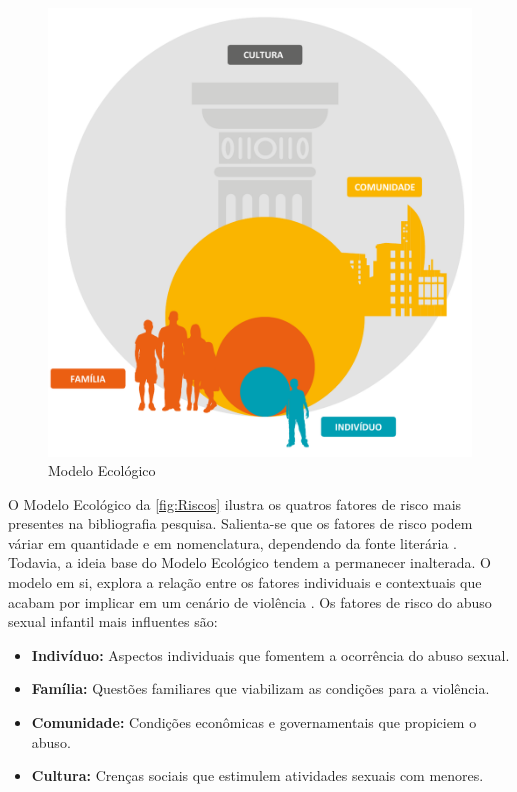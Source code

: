 \begin{figure}[htb]

	\caption{\label{fig:Riscos}Modelo Ecológico}
  \begin{center}
    \includegraphics[width=0.75\linewidth]{./Figuras/FatoresRisco.pdf}
	\end{center}

\end{figure}

O Modelo Ecológico da \autoref{fig:Riscos} ilustra os quatros fatores de risco mais presentes na bibliografia pesquisa. Salienta-se que os fatores de risco podem váriar em quantidade e em nomenclatura, dependendo da fonte literária \cite{centers2004sexual, sexual2017department, blasco2018abuso, topromising}. Todavia, a ideia base do Modelo Ecológico tendem a permanecer inalterada. O modelo em si, explora a relação entre os fatores individuais e contextuais que acabam por implicar em um cenário de violência \cite{dahlberg2006violencia}. Os fatores de risco do abuso sexual infantil mais influentes são:

\begin{itemize}
  \item \textbf{Indivíduo:} \hfill Aspectos individuais que fomentem a ocorrência do abuso sexual. %
  \item \textbf{Família:} \hfill Questões familiares que viabilizam as condições para a violência.  %
  \item \textbf{Comunidade:} Condições econômicas e governamentais que propiciem o abuso.
  \item \textbf{Cultura:} \hfill Crenças sociais que estimulem atividades sexuais com menores. 
\end{itemize}


